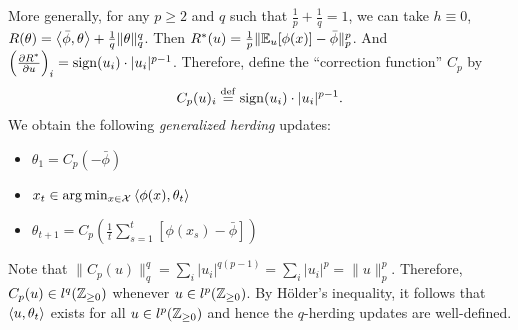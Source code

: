 \documentclass[paper.tex]{subfiles}
\begin{document}
More generally, for any 
$p \geq 2$ and $q$ such that $\frac{1}{p} + \frac{1}{q} = 1$, we can take 
$h \equiv 0$, $R(\theta) = \left\langle \bar{\phi}, \theta \right\rangle + \frac{1}{q}\|\theta\|_q^q$. 
Then $R^*(u) = \frac{1}{p}\|\mathbb{E}_{u}[\phi(x)]-\bar{\phi}\|_p^p$. And 
$\left(\frac{\partial R^*}{\partial u}\right)_i = \operatorname{sign}(u_i) \cdot |u_i|^{p-1}$. 
Therefore, define the ``correction function'' $C_p$ by
\begin{equation}
C_p(u)_i \stackrel{\mathrm{def}}{=} \operatorname{sign}(u_i) \cdot |u_i|^{p-1}.
\end{equation}
We obtain the following \emph{generalized herding} updates:
\begin{itemize}
\item $\theta_{1} = C_p(-\bar{\phi})$
\item $x_{t} \in \arg\min_{x \in \mathcal{X}} \left\langle \phi(x), \theta_t \right\rangle$
\item $\theta_{t+1} = C_p\left(\frac{1}{t} \sum_{s=1}^t [\phi(x_s)-\bar{\phi}]\right)$
\end{itemize}
Note that $\|C_p(u)\|_q^q = \sum_{i} |u_i|^{q(p-1)} = \sum_{i} |u_i|^p = \|u\|_p^p$. 
Therefore, $C_p(u) \in l^q(\mathbb{Z}_{\geq 0})$ whenever $u \in l^p(\mathbb{Z}_{\geq 0})$. By 
H\"{o}lder's inequality, it follows that $\left\langle u, \theta_t \right\rangle$ exists for all 
$u \in l^p(\mathbb{Z}_{\geq 0})$ and hence the $q$-herding updates are well-defined.
\end{document}
